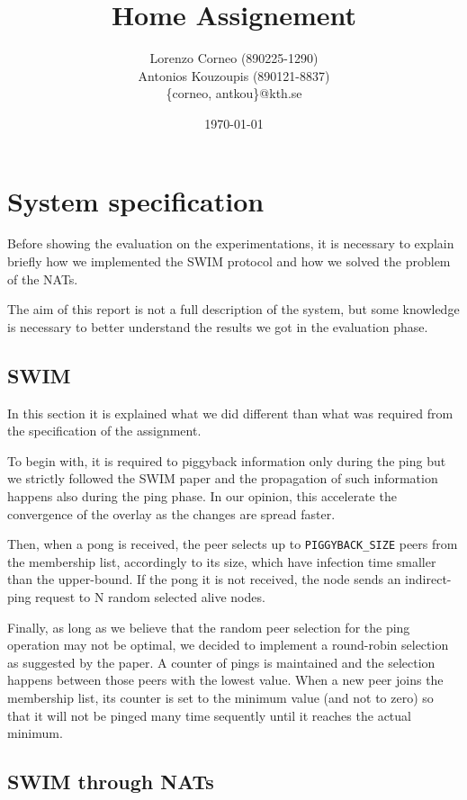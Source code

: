 \documentclass[10pt,a4paper]{proc}
\begin{document}
\title{Home Assignement}
\author{Lorenzo Corneo (890225-1290) \\ Antonios Kouzoupis (890121-8837)\\
	\{corneo, antkou\}@kth.se}
\date{\today}
\maketitle

\section{System specification}
Before showing the evaluation on the experimentations, it is necessary to explain briefly how we implemented the SWIM protocol and how we solved the problem of the NATs. 

The aim of this report is not a full description of the system, but some knowledge is necessary to better understand the results we got in the evaluation phase.

\subsection{SWIM}
In this section it is explained what we did different than what was required from the specification of the assignment.

To begin with, it is required to piggyback information only during the ping but we strictly followed the SWIM paper and the propagation of such information happens also during the ping phase. In our opinion, this accelerate the convergence of the overlay as the changes are spread faster.

Then, when a pong is received, the peer selects up to \texttt{PIGGYBACK\_SIZE} peers from the membership list, accordingly to its size, which have infection time smaller than the upper-bound. If the pong it is not received, the node sends an indirect-ping request to N random selected alive nodes.

Finally, as long as we believe that the random peer selection for the ping operation may not be optimal, we decided to implement a round-robin selection as suggested by the paper. A counter of pings is maintained and the selection happens between those peers with the lowest value. When a new peer joins the membership list, its counter is set to the minimum value (and not to zero) so that it will not be pinged many time sequently until it reaches the actual minimum.

\subsection{SWIM through NATs}
\end{document}
